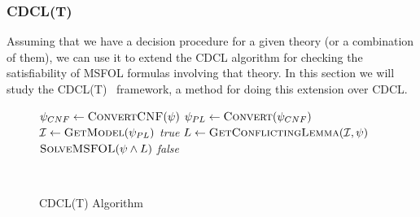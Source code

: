 
\subsubsection{CDCL(T)}

Assuming that we have a decision procedure for a given theory (or a combination of them), we can use it to extend the CDCL algorithm for checking the satisfiability of MSFOL formulas involving that theory. In this section we will study the CDCL(T)~\cite{cdcl_t} framework, a method for doing this extension over CDCL.\

\begin{figure}[t]
\begin{algorithmic}[1]
\State $\psi_{CNF} \gets \Call{ConvertCNF}{\psi}$
\State $\psi_{PL} \gets \Call{Convert}{\psi_{CNF}}$ 
  \State $\mathcal{I} \gets \Call{GetModel}{\psi_{PL}}$
   
    \State \Return \textit{true}
  \EndIf
  \State $L \gets \Call{GetConflictingLemma}{\mathcal{I}, \psi}$
  \State \Return $\Call{SolveMSFOL}{\psi \wedge L}$
\EndIf
\State \Return \textit{false}
\EndFunction
\end{algorithmic}
\caption{CDCL(T) Algorithm}~\label{cdclTAlgo}
\end{figure}

